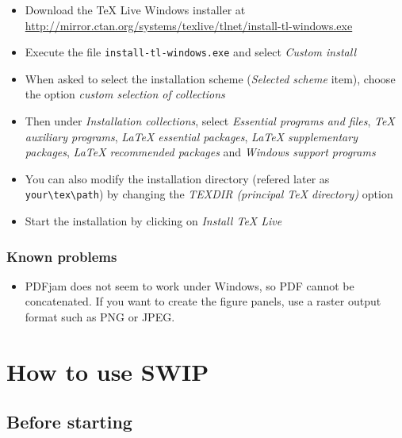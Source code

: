 \documentclass[twoside,a4paper]{article}
\begin{document}
\begin{itemize}
\setlength\itemsep{2ex}
\setlength{\parindent}{5ex}
\item Download the TeX Live Windows installer at \url{http://mirror.ctan.org/systems/texlive/tlnet/install-tl-windows.exe}

\item Execute the file \verb|install-tl-windows.exe| and select \textit{Custom install}

\item When asked to select the installation scheme (\textit{Selected scheme} item), choose the option \textit{custom selection of collections}

\item Then under \textit{Installation collections}, select \textit{Essential programs and files}, \textit{TeX auxiliary programs}, \textit{LaTeX essential packages}, \textit{LaTeX supplementary packages}, \textit{LaTeX recommended packages} and \textit{Windows support programs}

\item You can also modify the installation directory (refered later as \verb|your\tex\path|) by changing the \textit{TEXDIR (principal TeX directory)} option

\item Start the installation by clicking on \textit{Install TeX Live}

\end{itemize}

\subsubsection{Known problems}
\begin{itemize}
\setlength\itemsep{2ex}
\setlength{\parindent}{5ex}
\item PDFjam does not seem to work under Windows, so PDF cannot be concatenated. If you want to create the figure panels, use a raster output format such as PNG or JPEG.

\end{itemize}


\clearpage
\section{How to use SWIP}
\subsection{Before starting}
\end{document}
